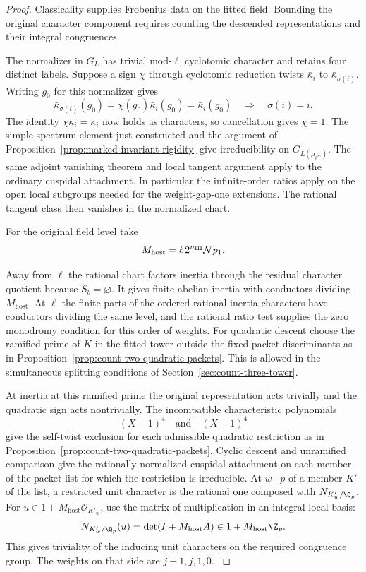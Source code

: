 \begin{proof}

Classicality supplies Frobenius data on the fitted field. Bounding the original character component requires counting the descended representations and their integral congruences.

The normalizer in \(G_L\) has trivial mod-\(\ell\)
cyclotomic character and retains four distinct labels.
Suppose a sign \(\chi\) through cyclotomic reduction
twists \(\bar\kappa_i\) to \(\bar\kappa_{\sigma(i)}\).
Writing \(g_0\) for this normalizer gives
\[
 \bar\kappa_{\sigma(i)}(g_0)=\chi(g_0)\bar\kappa_i(g_0)
 =\bar\kappa_i(g_0)\quad\Longrightarrow\quad\sigma(i)=i .
\]
The identity \(\chi\bar\kappa_i=\bar\kappa_i\) now holds as characters, so cancellation gives \(\chi=1\). The simple-spectrum
element just constructed and the argument of
Proposition~\ref{prop:marked-invariant-rigidity} give irreducibility on
\(G_{L(\mu_{\ell^\infty})}\).
The same adjoint vanishing theorem and local tangent
argument apply to the ordinary cuspidal attachment.
In particular the infinite-order ratios apply on the
open local subgroups needed for the weight-gap-one
extensions. The rational tangent class then vanishes
in the normalized chart.


For the original field level take
\[
 M_{\mathrm{host}}=\ell\,2^{n_{\rm III}}\mathcal Np_1.
\]

Away from \(\ell\) the rational chart factors inertia
through the residual character quotient because
\(S_b=\varnothing\). It gives finite abelian inertia
with conductors dividing \(M_{\mathrm{host}}\).
At \(\ell\) the finite parts of the ordered rational
inertia characters have conductors dividing the same
level, and the rational ratio test supplies the zero
monodromy condition for this order of weights.
For quadratic descent choose the ramified prime of
\(K\) in the fitted tower outside the fixed packet
discriminants as in Proposition~\ref{prop:count-two-quadratic-packets}.
This is allowed in the simultaneous splitting
conditions of Section~\ref{sec:count-three-tower}.

At inertia at this ramified prime the original representation acts trivially and the quadratic sign acts nontrivially. The incompatible characteristic polynomials
\[
 (X-1)^4\quad\text{and}\quad (X+1)^4
\]
give the self-twist exclusion for each admissible quadratic restriction as in Proposition~\ref{prop:count-two-quadratic-packets}. Cyclic descent
and unramified comparison give the rationally
normalized cuspidal attachment on each member of the
packet list for which the restriction is irreducible.
At \(w\mid p\) of a member \(K'\) of the list, a
restricted unit character is the rational one composed
with \(N_{K'_w/\Q_p}\). For \(u\in1+M_{\mathrm{host}}\mathcal O_{K'_w}\), use the
matrix of multiplication in an integral local basis:
\[
 N_{K'_w/\Q_p}(u)=\det(I+M_{\mathrm{host}}A)
                         \in1+M_{\mathrm{host}}\Z_p .
\]
This gives triviality of the inducing unit characters on
the required congruence group. The weights on that side
are \(j+1,j,1,0\).
\cite{clozel-rajan,blggt,blggt-lg,thorne-adjoint}\label{cor:ordinary-count-iii-point-output-2}


\end{proof}
